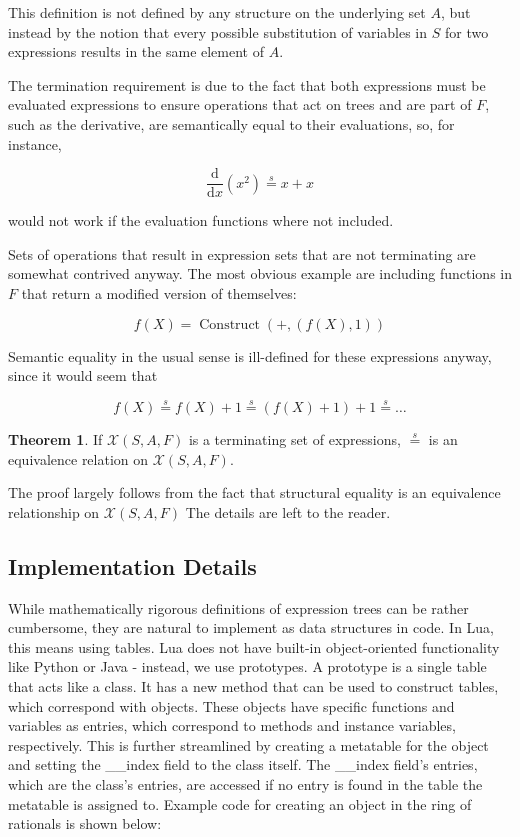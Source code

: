 \documentclass{article}
\theoremstyle{definition}
\newtheorem{thm}{Theorem}[section]
\DeclareMathOperator{\construct}{Construct}
\begin{document}
This definition is not defined by any structure on the underlying set $A$, but instead by the notion that every possible substitution of variables in $S$ for two expressions results in the same element of $A$.

The termination requirement is due to the fact that both expressions must be evaluated expressions to ensure operations that act on trees and are part of $F$, such as the derivative, are semantically equal to their evaluations, so, for instance,

\begin{equation*}
    \frac{\mathrm{d}}{\mathrm{d}x} (x^2) \overset{s}{=} x+x 
\end{equation*}

would not work if the evaluation functions where not included.

Sets of operations that result in expression sets that are not terminating are somewhat contrived anyway. The most obvious example are including functions in $F$ that return a modified version of themselves:

\begin{equation*}
    f(X) = \construct(+, (f(X), 1))
\end{equation*}

Semantic equality in the usual sense is ill-defined for these expressions anyway, since it would seem that

\begin{equation*}
    f(X) \overset{s}{=} f(X) + 1 \overset{s}{=} (f(X) + 1)  + 1\overset{s}{=} \ldots
\end{equation*}

\begin{thm}
    If $\mathcal{X}(S,A,F)$ is a terminating set of expressions, $\overset{s}{=}$ is an equivalence relation on $\mathcal{X}(S,A,F)$.
\end{thm}

The proof largely follows from the fact that structural equality is an equivalence relationship on $\mathcal{X}(S,A,F)$ The details are left to the reader.

\subsection{Implementation Details}

While mathematically rigorous definitions of expression trees can be rather cumbersome, they are natural to implement as data structures in code. In Lua, this means using tables. Lua does not have built-in object-oriented functionality like Python or Java - instead, we use prototypes. \cite{pil} A prototype is a single table that acts like a class. It has a {\ttfamily new} method that can be used to construct tables, which correspond with objects. These objects have specific functions and variables as entries, which correspond to methods and instance variables, respectively. This is further streamlined by creating a metatable for the object and setting the {\ttfamily \_\_index} field to the class itself. The {\ttfamily \_\_index} field's entries, which are the class's entries, are accessed if no entry is found in the table the metatable is assigned to. Example code for creating an object in the ring of rationals is shown below:
\end{document}
